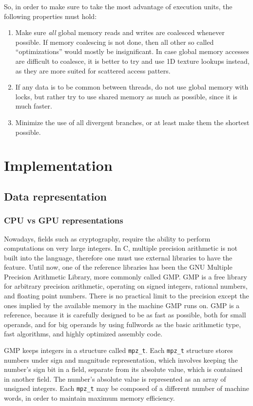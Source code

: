 \documentclass[10pt, a4paper]{report}
\begin{document}
So, in order to make sure to take the most advantage of execution units, the
following properties must hold:

\begin{enumerate}
\item Make sure \emph{all} global memory reads and writes are coalesced whenever
possible.
If memory coalescing is not done, then all other so called ``optimizations''
would mostly be insignificant.
In case global memory accesses are difficult to coalesce, it is better to try
and use 1D texture lookups instead, as they are more suited for scattered access
patters.
\item If any data is to be common between threads, do not use global memory with
locks, but rather try to use shared memory as much as possible, since it is much
faster.
\item Minimize the use of all divergent branches, or at least make them the
shortest possible.
\end{enumerate}

\chapter{Implementation}
\section{Data representation}
\subsection{CPU vs GPU representations}
Nowadays, fields such as cryptography, require the ability to perform
computations on very large integers.
In C, multiple precision arithmetic is not built into the language, therefore
one must use external libraries to have the feature.
Until now, one of the reference libraries has been the GNU Multiple Precision
Arithmetic Library, more commonly called GMP.
GMP is a free library for arbitrary precision arithmetic, operating on signed
integers, rational numbers, and floating point numbers.
There is no practical limit to the precision except the ones implied by the
available memory in the machine GMP runs on.
GMP is a reference, because it is carefully designed to be as fast as possible,
both for small operands, and for big operands by using fullwords as the basic
arithmetic type, fast algorithms, and highly optimized assembly code.

GMP keeps integers in a structure called \verb+mpz_t+.
Each \verb+mpz_t+ structure stores numbers under sign and magnitude
representation, which involves keeping the number's sign bit in a field,
separate from its absolute value, which is contained in another field.
The number's absolute value is represented as an array of unsigned integers.
Each \verb+mpz_t+ may be composed of a different number of machine words, in
order to maintain maximum memory efficiency.
\end{document}
